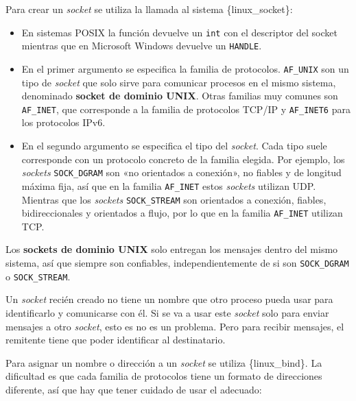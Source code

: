 Para crear un \emph{socket} se utiliza la llamada al sistema
\{linux\_socket\}:

\begin{Shaded}
\begin{Highlighting}[]
\OperatorTok{=}\OperatorTok{(} 
\OperatorTok{,}         
\OperatorTok{,}      
\OperatorTok{)}
\end{Highlighting}
\end{Shaded}

\begin{itemize}
\item
  En sistemas POSIX la función devuelve un \texttt{int} con el
  descriptor del socket mientras que en Microsoft Windows devuelve un
  \texttt{HANDLE}.
\item
  En el primer argumento se especifica la familia de protocolos.
  \texttt{AF\_UNIX} son un tipo de \emph{socket} que solo sirve para
  comunicar procesos en el mismo sistema, denominado \textbf{socket de
  dominio UNIX}{}. Otras familias muy comunes son \texttt{AF\_INET}, que
  corresponde a la familia de protocolos TCP/IP y \texttt{AF\_INET6}
  para los protocolos IPv6.
\item
  En el segundo argumento se especifica el tipo del \emph{socket}. Cada
  tipo suele corresponde con un protocolo concreto de la familia
  elegida. Por ejemplo, los \emph{sockets} \texttt{SOCK\_DGRAM} son «no
  orientados a conexión», no fiables y de longitud máxima fija, así que
  en la familia \texttt{AF\_INET} estos \emph{sockets} utilizan UDP.
  Mientras que los \emph{sockets} \texttt{SOCK\_STREAM} son orientados a
  conexión, fiables, bidireccionales y orientados a flujo, por lo que en
  la familia \texttt{AF\_INET} utilizan TCP.
\end{itemize}

Los \textbf{sockets de dominio UNIX} solo entregan los mensajes dentro
del mismo sistema, así que siempre son confiables, independientemente de
si son \texttt{SOCK\_DGRAM} o \texttt{SOCK\_STREAM}.

Un \emph{socket} recién creado no tiene un nombre que otro proceso pueda
usar para identificarlo y comunicarse con él. Si se va a usar este
\emph{socket} solo para enviar mensajes a otro \emph{socket}, esto es no
es un problema. Pero para recibir mensajes, el remitente tiene que poder
identificar al destinatario.

Para asignar un nombre o dirección a un \emph{socket} se utiliza
\{linux\_bind\}. La dificultad es que cada familia de protocolos tiene
un formato de direcciones diferente, así que hay que tener cuidado de
usar el adecuado:


